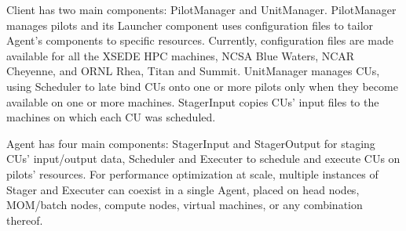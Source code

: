 \documentclass[preprint,12pt, a4paper]{elsarticle}
\begin{document}

Client has two main components: PilotManager and UnitManager. PilotManager
manages pilots and its Launcher component uses configuration files to tailor
Agent's components to specific resources. Currently, configuration files are
made available for all the XSEDE HPC machines, NCSA Blue Waters, NCAR
Cheyenne, and ORNL Rhea, Titan and Summit. 
%
UnitManager manages CUs, using Scheduler to late bind CUs onto one or more
pilots only when they become available on one or more machines. StagerInput
copies CUs' input files to the machines on which each CU was scheduled.


Agent has four main components: StagerInput and StagerOutput for staging CUs'
input/output data, Scheduler and Executer to schedule and execute CUs on
pilots' resources. For performance optimization at scale, multiple instances
of Stager and Executer can coexist in a single Agent, placed on head nodes,
MOM/batch nodes, compute nodes, virtual machines, or any combination thereof.

\end{document}
